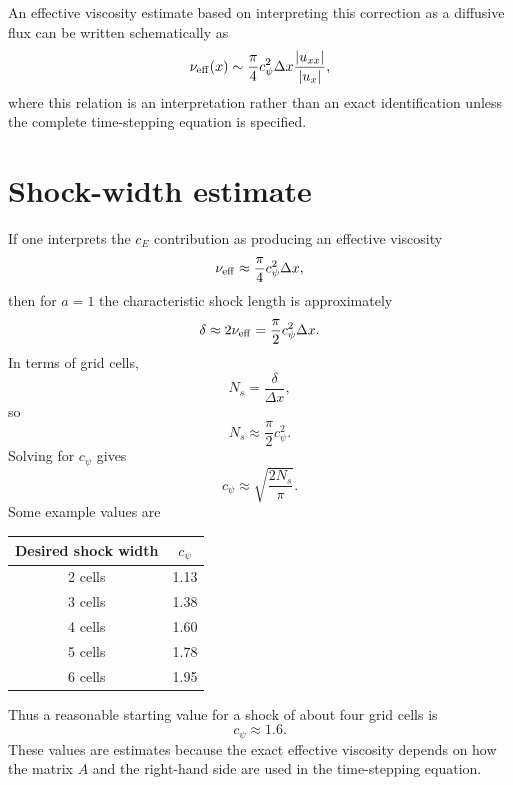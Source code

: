 \documentclass{mooiman_memo}
\begin{document}
An effective viscosity estimate based on interpreting this correction
as a diffusive flux can be written schematically as
%
\begin{equation}
    \nu_{\rm eff}(x)
    \sim
    \frac{\pi}{4}
    c_\psi^2\Delta x
    \frac{|u_{xx}|}{|u_x|},
\end{equation}
%
where this relation is an interpretation rather than an exact
identification unless the complete time-stepping equation is specified.
%
\section{Shock-width estimate}
%
If one interprets the $c_E$ contribution as producing an effective
viscosity
%
\begin{equation}
    \nu_{\rm eff}
    \approx
    \frac{\pi}{4}c_\psi^2\Delta x,
\end{equation}
%
then for $a=1$ the characteristic shock length is approximately
%
\begin{equation}
    \delta
    \approx
    2\nu_{\rm eff}
    =
    \frac{\pi}{2}c_\psi^2\Delta x.
\end{equation}
%
In terms of grid cells,
%
\begin{equation}
    N_s=\frac{\delta}{\Delta x},
\end{equation}
%
so
%
\begin{equation}
    \boxed{
    N_s\approx\frac{\pi}{2}c_\psi^2.
    }
\end{equation}
%
Solving for $c_\psi$ gives
%
\begin{equation}
    \boxed{
    c_\psi\approx
    \sqrt{\frac{2N_s}{\pi}}.
    }
\end{equation}
%
Some example values are
%
\begin{center}
\begin{tabular}{cc}
\toprule
Desired shock width & $c_\psi$\\
\midrule
2 cells & 1.13\\
3 cells & 1.38\\
4 cells & 1.60\\
5 cells & 1.78\\
6 cells & 1.95\\
\bottomrule
\end{tabular}
\end{center}
%
Thus a reasonable starting value for a shock of about four grid cells
is
%
\begin{equation}
    \boxed{c_\psi\approx1.6}.
\end{equation}
%
These values are estimates because the exact effective viscosity
depends on how the matrix $A$ and the right-hand side are used in the
time-stepping equation.
%
\newpage
\end{document}
